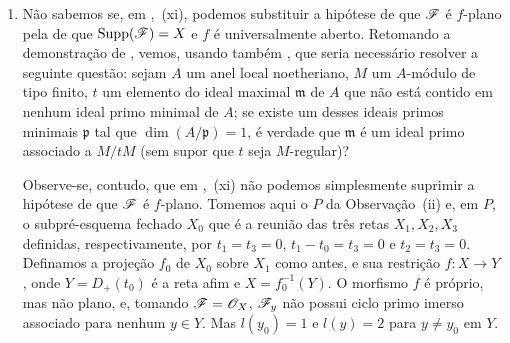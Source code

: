 \begin{remarks}[12.2.3]
\begin{enumerate}[label=(\roman*)]
\item Não sabemos se, em
,~(xi),
podemos substituir a
hipótese de que $\mathscr{F}$
é $f$-plano pela de que
$\operatorname{Supp}(\mathscr{F})=X$
e $f$ é universalmente
aberto. Retomando a
demonstração de
,
vemos, usando também
, que
seria necessário resolver
a seguinte questão: sejam
$A$ um anel local
noetheriano, $M$ um
$A$-módulo de tipo finito,
$t$ um elemento do ideal
maximal $\mathfrak m$
de $A$ que não está
contido em nenhum ideal
primo minimal de $A$;
se existe um desses
ideais primos minimais
$\mathfrak p$ tal que
$\dim(A/\mathfrak p)=1$,
é verdade que
$\mathfrak m$ é um ideal
primo associado a
$M/tM$ (sem supor que
$t$ seja $M$-regular)?

Observe-se, contudo, que
em ,~(xi)
não podemos simplesmente
suprimir a hipótese de que
$\mathscr{F}$ é $f$-plano.
Tomemos aqui o $P$ da
Observação~(ii) e, em $P$,
o subpré-esquema fechado
$X_0$ que é a reunião
das três retas
$X_1,X_2,X_3$ definidas,
respectivamente, por
$t_1=t_3=0$,
$t_1-t_0=t_3=0$ e
$t_2=t_3=0$. Definamos
a projeção $f_0$ de
$X_0$ sobre $X_1$ como
antes, e sua restrição
$f:X\to Y$, onde
$Y=D_+(t_0)$ é a reta
afim e $X=f_0^{-1}(Y)$.
O morfismo $f$ é próprio,
mas não plano, e, tomando
$\mathscr{F}=\mathscr{O}_X$,
$\mathscr{F}_y$ não possui
ciclo primo imerso
associado para nenhum
$y\in Y$. Mas
$l(y_0)=1$ e $l(y)=2$
para $y\ne y_0$ em $Y$.
\end{enumerate}
\end{remarks}

